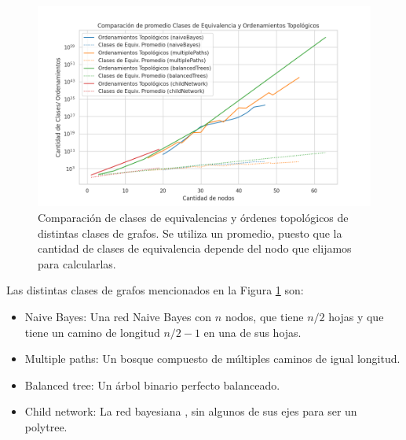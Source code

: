 \begin{figure}[ht]
	\centering
	\includegraphics[width=1\linewidth]{img/equivalentClassesVsToposorts.png}
	\caption[Caption for image]{Comparación de clases de equivalencias y órdenes topológicos de distintas clases de grafos. Se utiliza un promedio, puesto que la cantidad de clases de equivalencia depende del nodo que elijamos para calcularlas. \footnotemark }
	\label{fig:equivalenceClassesVsToposortsNumberPlot}
\end{figure}



Las distintas clases de grafos mencionados en la Figura \ref{fig:equivalenceClassesVsToposortsNumberPlot} son: 
\begin{itemize}
	\item Naive Bayes: Una red Naive Bayes con $n$ nodos, que tiene $n/2$ hojas y que tiene un camino de longitud $n/2-1$ en una de sus hojas. %
	\item Multiple paths: Un bosque compuesto de múltiples caminos de igual longitud. 
	\item Balanced tree: Un árbol binario perfecto balanceado.  
	\item Child network: La red bayesiana \childNetwork, sin algunos de sus ejes para ser un polytree. 
	
\end{itemize}


